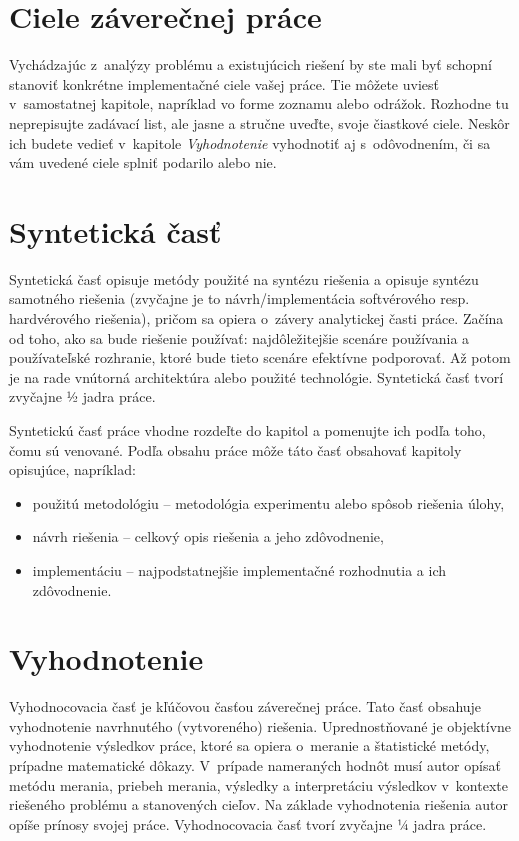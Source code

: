 \section*{Ciele záverečnej práce}

Vychádzajúc z~analýzy problému a existujúcich riešení by ste mali byť schopní stanoviť konkrétne implementačné ciele vašej práce. Tie môžete uviesť v~samostatnej kapitole, napríklad vo forme zoznamu alebo odrážok. Rozhodne tu neprepisujte zadávací list, ale jasne a stručne uveďte, svoje čiastkové ciele. Neskôr ich budete vedieť v~kapitole \emph{Vyhodnotenie} vyhodnotiť aj s~odôvodnením, či sa vám uvedené ciele splniť podarilo alebo nie.


\section*{Syntetická časť}

Syntetická časť opisuje metódy použité na syntézu riešenia a opisuje syntézu samotného riešenia (zvyčajne je to návrh/implementácia softvérového resp. hardvérového riešenia), pričom sa opiera o~závery analytickej časti práce. Začína od toho, ako sa bude riešenie používať: najdôležitejšie scenáre používania a používateľské rozhranie, ktoré bude tieto scenáre efektívne podporovať. Až potom je na rade vnútorná architektúra alebo použité technológie. Syntetická časť tvorí zvyčajne ½ jadra práce.

Syntetickú časť práce vhodne rozdeľte do kapitol a pomenujte ich podľa toho, čomu sú venované. Podľa obsahu práce môže táto časť obsahovať kapitoly opisujúce, napríklad:

\begin{itemize}
  \item použitú metodológiu -- metodológia experimentu alebo spôsob riešenia úlohy,
  \item návrh riešenia -- celkový opis riešenia a jeho zdôvodnenie,
  \item implementáciu -- najpodstatnejšie implementačné rozhodnutia a ich zdôvodnenie.
\end{itemize}


\section*{Vyhodnotenie}

Vyhodnocovacia časť je kľúčovou časťou záverečnej práce. Tato časť obsahuje vyhodnotenie navrhnutého (vytvoreného) riešenia. Uprednostňované je objektívne vyhodnotenie výsledkov práce, ktoré sa opiera o~meranie a štatistické metódy, prípadne matematické dôkazy. V~prípade nameraných hodnôt musí autor opísať metódu merania, priebeh merania, výsledky a interpretáciu výsledkov v~kontexte riešeného problému a stanovených cieľov. Na základe vyhodnotenia riešenia autor opíše prínosy svojej práce. Vyhodnocovacia časť tvorí zvyčajne ¼ jadra práce.

